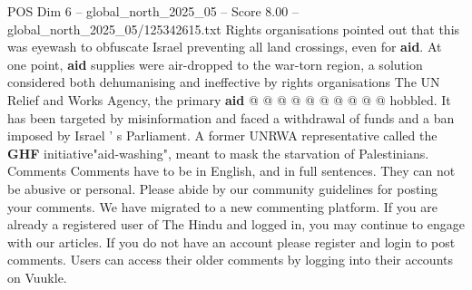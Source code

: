 \begin{textsample}{POS Dim 6 – global\_north\_2025\_05 – Score 8.00 – global\_north\_2025\_05/125342615.txt}
Rights organisations pointed out that this was eyewash to obfuscate Israel preventing all land crossings, even for \textbf{aid}.
At one point, \textbf{aid} supplies were air-dropped to the war-torn region, a solution considered both dehumanising and ineffective by rights organisations The UN Relief and Works Agency, the primary \textbf{aid} @ @ @ @ @ @ @ @ @ @ hobbled.
It has been targeted by misinformation and faced a withdrawal of funds and a ban imposed by Israel ' s Parliament.
A former UNRWA representative called the \textbf{GHF} initiative"aid-washing", meant to mask the starvation of Palestinians.
Comments Comments have to be in English, and in full sentences.
They can not be abusive or personal.
Please abide by our community guidelines for posting your comments.
We have migrated to a new commenting platform.
If you are already a registered user of The Hindu and logged in, you may continue to engage with our articles.
If you do not have an account please register and login to post comments.
Users can access their older comments by logging into their accounts on Vuukle.

\end{textsample}
